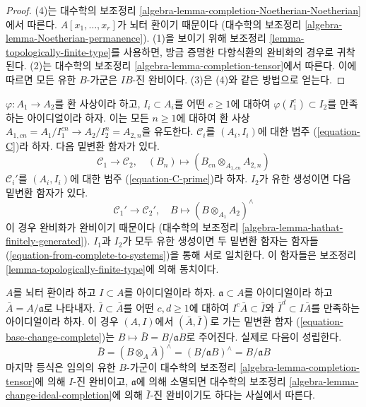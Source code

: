 \begin{proof}
(4)는 대수학의 보조정리 \ref{algebra-lemma-completion-Noetherian-Noetherian}에서 따른다.
$A[x_1, \ldots, x_r]$가 뇌터 환이기 때문이다
(대수학의 보조정리 \ref{algebra-lemma-Noetherian-permanence}).
(1)을 보이기 위해 보조정리 \ref{lemma-topologically-finite-type}를 사용하면,
방금 증명한 다항식환의 완비화의 경우로 귀착된다.
(2)는 대수학의 보조정리 \ref{algebra-lemma-completion-tensor}에서 따른다.
이에 따르면 모든 유한 $B$-가군은 $IB$-진 완비이다.
(3)은 (4)와 같은 방법으로 얻는다.
\end{proof}

\begin{remark}[밑변환]
\label{remark-base-change}
$\varphi : A_1 \to A_2$를 환 사상이라 하고,
$I_i \subset A_i$를 어떤 $c \geq 1$에 대하여
$\varphi(I_1^c) \subset I_2$를 만족하는 아이디얼이라 하자.
이는 모든 $n \geq 1$에 대하여 환 사상
$A_{1, cn} = A_1/I_1^{cn} \to A_2/I_2^n = A_{2, n}$을 유도한다.
$\mathcal{C}_i$를 $(A_i, I_i)$에 대한 범주 (\ref{equation-C})라 하자.
다음 밑변환 함자가 있다.
\begin{equation}
\label{equation-base-change-systems}
\mathcal{C}_1 \longrightarrow \mathcal{C}_2,\quad
(B_n) \longmapsto (B_{cn} \otimes_{A_{1, cn}} A_{2, n})
\end{equation}
$\mathcal{C}_i'$를 $(A_i, I_i)$에 대한 범주 (\ref{equation-C-prime})라 하자.
$I_2$가 유한 생성이면 다음 밑변환 함자가 있다.
\begin{equation}
\label{equation-base-change-complete}
\mathcal{C}_1' \longrightarrow \mathcal{C}_2',\quad
B \longmapsto (B \otimes_{A_1} A_2)^\wedge
\end{equation}
이 경우 완비화가 완비이기 때문이다
(대수학의 보조정리 \ref{algebra-lemma-hathat-finitely-generated}).
$I_1$과 $I_2$가 모두 유한 생성이면 두 밑변환 함자는
함자들 (\ref{equation-from-complete-to-systems})을 통해 서로 일치한다.
이 함자들은 보조정리 \ref{lemma-topologically-finite-type}에 의해 동치이다.
\end{remark}

\begin{remark}
\label{remark-take-bar}
$A$를 뇌터 환이라 하고 $I \subset A$를 아이디얼이라 하자.
$\mathfrak a \subset A$를 아이디얼이라 하고 $\bar A = A/\mathfrak a$로 나타내자.
$\bar I \subset \bar A$를 어떤 $c, d \geq 1$에 대하여
$I^c \bar A \subset \bar I$와 $\bar I^d \subset I\bar A$를 만족하는 아이디얼이라 하자.
이 경우 $(A, I)$에서 $(\bar A, \bar I)$로 가는 밑변환 함자
(\ref{equation-base-change-complete})는 $B \mapsto \bar B = B/\mathfrak aB$로 주어진다.
실제로 다음이 성립한다.
\begin{equation}
\label{equation-base-change-to-closed}
\bar B = (B \otimes_A \bar A)^\wedge = (B/\mathfrak a B)^\wedge =
B/\mathfrak a B
\end{equation}
마지막 등식은 임의의 유한 $B$-가군이 대수학의 보조정리
\ref{algebra-lemma-completion-tensor}에 의해 $I$-진 완비이고,
$\mathfrak a$에 의해 소멸되면 대수학의 보조정리
\ref{algebra-lemma-change-ideal-completion}에 의해 $\bar I$-진 완비이기도 하다는 사실에서 따른다.
\end{remark}

